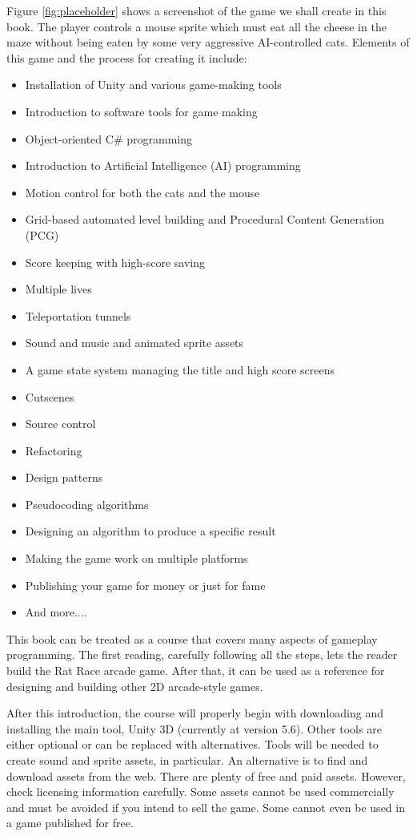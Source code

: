 \documentclass[12pt]{amsbook}
\theoremstyle{definition}
\theoremstyle{remark}
\numberwithin{figure}{chapter}
\numberwithin{table}{chapter}
\numberwithin{section}{chapter}
\numberwithin{equation}{section}
\newcommand{\csharp}{\ensuremath{\mbox{C}\#}\xspace}
\begin{document}
Figure \ref{fig:placeholder} shows a screenshot of the game we shall create in this book.  The player controls a mouse sprite which must eat all the cheese in the maze without being eaten by some very aggressive AI-controlled cats.  Elements of this game and the process for creating it include:

\begin{itemize}
\item Installation of Unity and various game-making tools
\item Introduction to software tools for game making
\item Object-oriented \csharp programming
\item Introduction to Artificial Intelligence (AI) programming
\item Motion control for both the cats and the mouse
\item Grid-based automated level building and Procedural Content Generation (PCG)
\item Score keeping with high-score saving
\item Multiple lives
\item Teleportation tunnels
\item Sound and music and animated sprite assets
\item A game state system managing the title and high score screens
\item Cutscenes
\item Source control
\item Refactoring
\item Design patterns
\item Pseudocoding algorithms
\item Designing an algorithm to produce a specific result
\item Making the game work on multiple platforms
\item Publishing your game for money or just for fame
\item And more....
\end{itemize}

This book can be treated as a course that covers many aspects of gameplay programming.  The first reading, carefully following all the steps, lets the reader build the Rat Race arcade game.  After that, it can be used as a reference for designing and building other 2D arcade-style games.

After this introduction, the course will properly begin with downloading and installing the main tool, Unity 3D (currently at version 5.6).  Other tools are either optional or can be replaced with alternatives.  Tools will be needed to create sound and sprite assets, in particular.  An alternative is to find and download assets from the web.  There are plenty of free and paid assets.  However, check licensing information carefully.  Some assets cannot be used commercially and must be avoided if you intend to sell the game.  Some cannot even be used in a game published for free.
\end{document}

